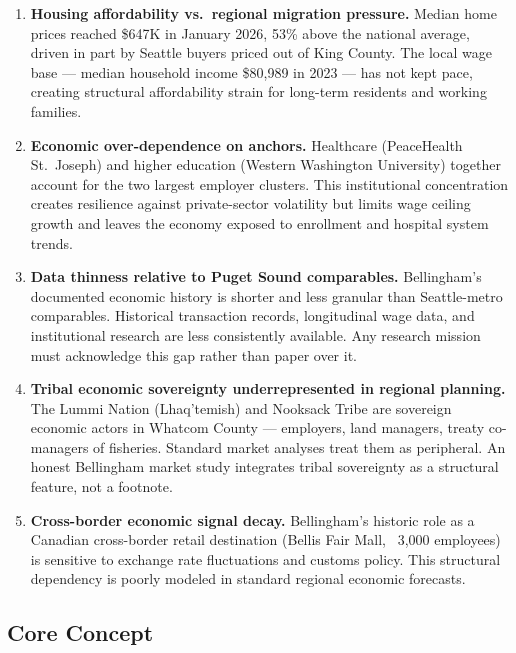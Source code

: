 \documentclass[11pt,letterpaper]{article}
\begin{document}
\begin{enumerate}[leftmargin=*, label=\textbf{P-\arabic*:}]
  \item \textbf{Housing affordability vs.\ regional migration pressure.} Median home prices reached \$647K in January 2026, 53\% above the national average, driven in part by Seattle buyers priced out of King County. The local wage base --- median household income \$80,989 in 2023 --- has not kept pace, creating structural affordability strain for long-term residents and working families.

  \item \textbf{Economic over-dependence on anchors.} Healthcare (PeaceHealth St.\ Joseph) and higher education (Western Washington University) together account for the two largest employer clusters. This institutional concentration creates resilience against private-sector volatility but limits wage ceiling growth and leaves the economy exposed to enrollment and hospital system trends.

  \item \textbf{Data thinness relative to Puget Sound comparables.} Bellingham's documented economic history is shorter and less granular than Seattle-metro comparables. Historical transaction records, longitudinal wage data, and institutional research are less consistently available. Any research mission must acknowledge this gap rather than paper over it.

  \item \textbf{Tribal economic sovereignty underrepresented in regional planning.} The Lummi Nation (Lhaq'temish) and Nooksack Tribe are sovereign economic actors in Whatcom County --- employers, land managers, treaty co-managers of fisheries. Standard market analyses treat them as peripheral. An honest Bellingham market study integrates tribal sovereignty as a structural feature, not a footnote.

  \item \textbf{Cross-border economic signal decay.} Bellingham's historic role as a Canadian cross-border retail destination (Bellis Fair Mall, ~3,000 employees) is sensitive to exchange rate fluctuations and customs policy. This structural dependency is poorly modeled in standard regional economic forecasts.
\end{enumerate}

\subsection{Core Concept}
\end{document}
